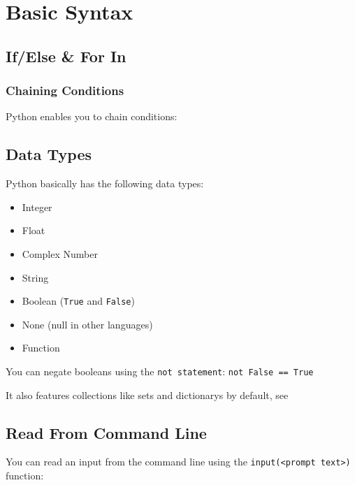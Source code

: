 \section{Basic Syntax}

    \subsection{If/Else \& For In}

        \subsubsection{Chaining Conditions}
            Python enables you to chain conditions:


    \subsection{Data Types}
        Python basically has the following data types:
        \begin{itemize}
            \item Integer
            \item Float
            \item Complex Number
            \item String
            \item Boolean (\texttt{True} and \texttt{False})
            \item None (null in other languages)
            \item Function
        \end{itemize}

        You can negate booleans using the \texttt{not statement}:
        \texttt{not False == True}

        It also features collections like sets and dictionarys by default, see 

    \subsection{Read From Command Line}
        You can read an input from the command line using the
        \texttt{input(<prompt text>)} function:

